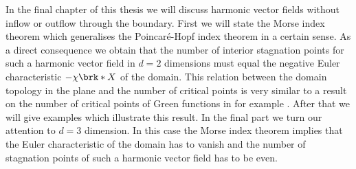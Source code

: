 In the final chapter of this thesis we will discuss harmonic vector fields without
inflow or outflow through the boundary.
First we will state the Morse index theorem which generalises the Poincaré-Hopf index theorem in a certain sense.
As a direct consequence we obtain that the
number of interior stagnation points for such a harmonic vector field in $d=2$ dimensions 
must equal the negative Euler characteristic $-\chi\brk*{X}$ of the domain.
This relation between the domain topology in the plane and the number of critical points is
very similar to a result on the number of critical points of Green functions in
for example \cite[p.133]{Nehari1975}.
After that we will give examples which illustrate this result.
In the final part we turn our attention to $d=3$ dimension.
In this case the Morse index theorem implies that
the Euler characteristic of the domain has to vanish and the number of stagnation points of
such a harmonic vector field has to be even.


